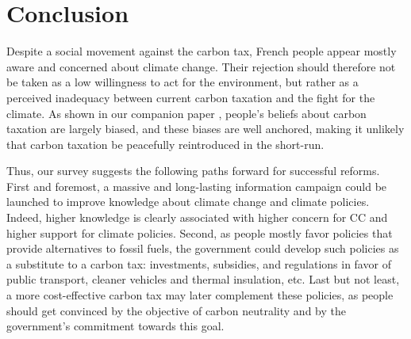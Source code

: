 \documentclass[english,5p,authoryear]{elsarticle}
\begin{document}





\section{Conclusion}\label{sec:conclusion}

Despite a social movement against the carbon tax, French people appear mostly aware and concerned about climate change. Their rejection should therefore not be taken as a low willingness to act for the environment, but rather as a perceived inadequacy between current carbon taxation and the fight for the climate. As shown in our companion paper \citet{douenne_can_2019}, people's beliefs about carbon taxation are largely biased, and these biases are well anchored, making it unlikely that carbon taxation be peacefully reintroduced in the short-run. 

Thus, our survey suggests the following paths forward for successful reforms. First and foremost, a massive and long-lasting information campaign could be launched to improve knowledge about climate change and climate policies. Indeed, higher knowledge is clearly associated with higher concern for CC and higher support for climate policies. Second, as people mostly favor policies that provide alternatives to fossil fuels, the government could develop such policies as a substitute to a carbon tax: investments, subsidies, and regulations in favor of public transport, cleaner vehicles and thermal insulation, etc. Last but not least, a more cost-effective carbon tax may later complement these policies, as people should get convinced by the objective of carbon neutrality and by the government's commitment towards this goal. 
\end{document}
